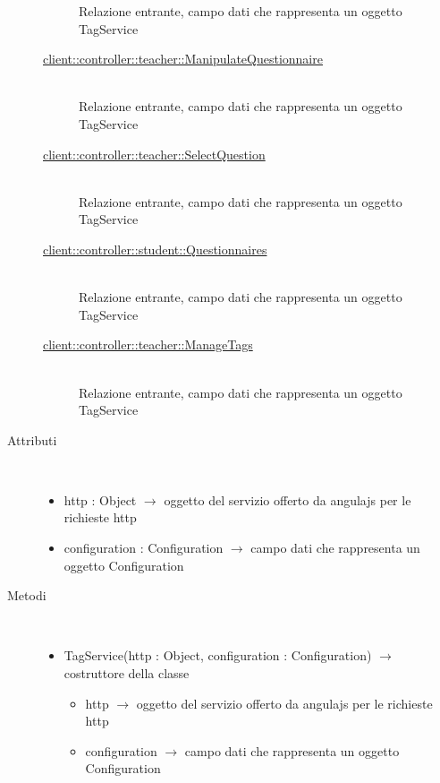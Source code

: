 \begin{description}
\begin{description}
	Relazione entrante, campo dati che rappresenta un oggetto TagService
	\item[\hyperlink{client::controller::teacher::ManipulateQuestionnaire}{client::controller::teacher::ManipulateQuestionnaire}] \hfill \\
	Relazione entrante, campo dati che rappresenta un oggetto TagService
	\item[\hyperlink{client::controller::teacher::SelectQuestion}{client::controller::teacher::SelectQuestion}] \hfill \\
	Relazione entrante, campo dati che rappresenta un oggetto TagService
	\item[\hyperlink{client::controller::student::Questionnaires}{client::controller::student::Questionnaires}] \hfill \\
	Relazione entrante, campo dati che rappresenta un oggetto TagService
	\item[\hyperlink{client::controller::teacher::ManageTags}{client::controller::teacher::ManageTags}] \hfill \\
	Relazione entrante, campo dati che rappresenta un oggetto TagService
\end{description}

\item[Attributi] \hfill \\
\vspace{-7mm}
\begin{itemize}
	\item http : Object $\rightarrow$ oggetto del servizio offerto da angulajs per le richieste http
	\item configuration : Configuration $\rightarrow$ campo dati che rappresenta un oggetto Configuration
\end{itemize}

\item[Metodi] \hfill \\
\vspace{-7mm}
\begin{itemize}
	\item TagService(http : Object, configuration : Configuration) $\rightarrow$ costruttore della classe\begin{itemize}
		\item http $\rightarrow$ oggetto del servizio offerto da angulajs per le richieste http
		\item configuration $\rightarrow$ campo dati che rappresenta un oggetto Configuration
	\end{itemize}
	

\end{itemize}
\end{description}

